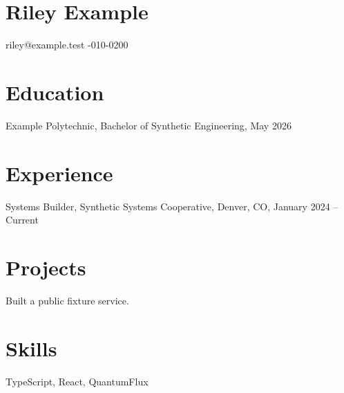 \documentclass{article}
\begin{document}
\section*{Riley Example}
riley@example.test -010-0200
\section*{Education}
Example Polytechnic, Bachelor of Synthetic Engineering, May 2026
\section*{Experience}
Systems Builder, Synthetic Systems Cooperative, Denver, CO, January 2024 -- Current
\section*{Projects}
Built a public fixture service.
\section*{Skills}
TypeScript, React, QuantumFlux
\end{document}
